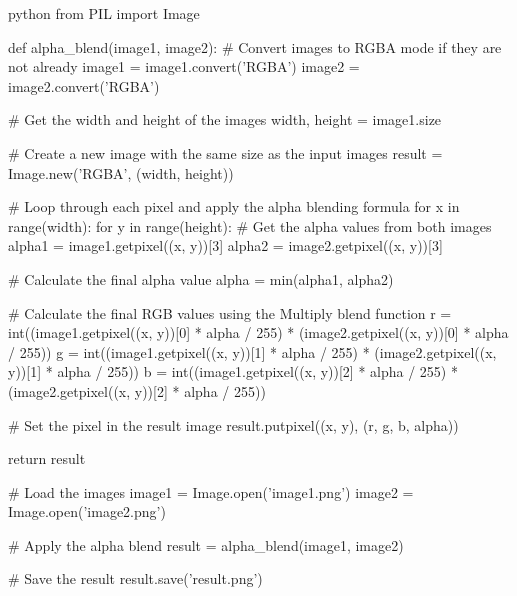 python
from PIL import Image

def alpha_blend(image1, image2):
    # Convert images to RGBA mode if they are not already
    image1 = image1.convert('RGBA')
    image2 = image2.convert('RGBA')

    # Get the width and height of the images
    width, height = image1.size

    # Create a new image with the same size as the input images
    result = Image.new('RGBA', (width, height))

    # Loop through each pixel and apply the alpha blending formula
    for x in range(width):
        for y in range(height):
            # Get the alpha values from both images
            alpha1 = image1.getpixel((x, y))[3]
            alpha2 = image2.getpixel((x, y))[3]

            # Calculate the final alpha value
            alpha = min(alpha1, alpha2)

            # Calculate the final RGB values using the Multiply blend function
            r = int((image1.getpixel((x, y))[0] * alpha / 255) * (image2.getpixel((x, y))[0] * alpha / 255))
            g = int((image1.getpixel((x, y))[1] * alpha / 255) * (image2.getpixel((x, y))[1] * alpha / 255))
            b = int((image1.getpixel((x, y))[2] * alpha / 255) * (image2.getpixel((x, y))[2] * alpha / 255))

            # Set the pixel in the result image
            result.putpixel((x, y), (r, g, b, alpha))

    return result

# Load the images
image1 = Image.open('image1.png')
image2 = Image.open('image2.png')

# Apply the alpha blend
result = alpha_blend(image1, image2)

# Save the result
result.save('result.png')